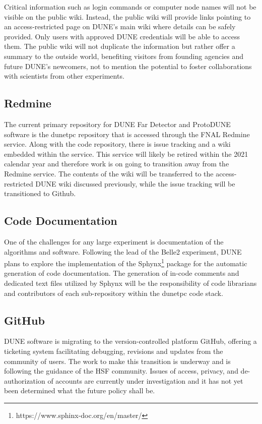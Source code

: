 Critical information such as login commands or computer node names will not be visible on the public wiki. Instead, the public wiki will provide links pointing to an access-restricted page on DUNE’s main wiki where details can be safely provided. Only users with approved DUNE credentials will be able to access them. The public wiki will not duplicate the information but rather offer a summary to the outside world, benefiting visitors from founding agencies and future DUNE’s newcomers, not to mention the potential to foster collaborations with scientists from other experiments.

\subsection{Redmine}
The current primary repository for DUNE Far Detector and ProtoDUNE software is the dunetpc repository that is accessed through the FNAL Redmine service. Along with the code repository, there is issue tracking and a wiki embedded within the service. This service will likely be retired within the 2021 calendar year and therefore work is on going to transition away from the Redmine service. The contents of the wiki will be transferred to the access-restricted DUNE wiki discussed previously, while the issue tracking will be transitioned to Github.

\subsection{Code Documentation}
One of the challenges for any large experiment is documentation of the algorithms and software. Following the lead of the Belle2 experiment, DUNE plans to explore the implementation of the Sphynx\footnote{https://www.sphinx-doc.org/en/master/} package for the automatic generation of code documentation. The generation of in-code comments and dedicated text files utilized by Sphynx will be the responsibility of code librarians and contributors of each sub-repository within the dunetpc code stack.

\subsection{GitHub}
DUNE software is migrating to the version-controlled platform GitHub, offering a ticketing system facilitating debugging, revisions and updates from the community of users. The work to make this transition is underway and is following the guidance of the HSF community. Issues of access, privacy, and de-authorization of accounts are currently under investigation and it has not yet been determined what the future policy shall be.

